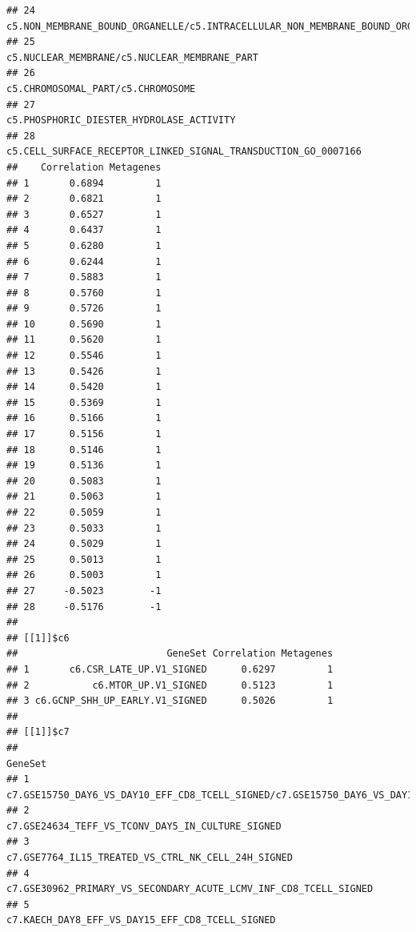 \documentclass{article}\usepackage[]{graphicx}\usepackage[]{color}
\makeatletter
\newenvironment{kframe}{%
 \def\at@end@of@kframe{}%
 \ifinner\ifhmode%
  \def\at@end@of@kframe{\end{minipage}}%
  \begin{minipage}{\columnwidth}%
 \fi\fi%
 \def\FrameCommand##1{\hskip\@totalleftmargin \hskip-\fboxsep
 \colorbox{shadecolor}{##1}\hskip-\fboxsep
     \hskip-\linewidth \hskip-\@totalleftmargin \hskip\columnwidth}%
 \MakeFramed {\advance\hsize-\width
   \@totalleftmargin\z@ \linewidth\hsize
   \@setminipage}}%
 {\par\unskip\endMakeFramed%
 \at@end@of@kframe}
\newenvironment{knitrout}{}{} %
\makeatother
\begin{document}
\begin{knitrout}
\begin{kframe}
\begin{verbatim}
## 24         c5.NON_MEMBRANE_BOUND_ORGANELLE/c5.INTRACELLULAR_NON_MEMBRANE_BOUND_ORGANELLE
## 25                                          c5.NUCLEAR_MEMBRANE/c5.NUCLEAR_MEMBRANE_PART
## 26                                                     c5.CHROMOSOMAL_PART/c5.CHROMOSOME
## 27                                              c5.PHOSPHORIC_DIESTER_HYDROLASE_ACTIVITY
## 28                        c5.CELL_SURFACE_RECEPTOR_LINKED_SIGNAL_TRANSDUCTION_GO_0007166
##    Correlation Metagenes
## 1       0.6894         1
## 2       0.6821         1
## 3       0.6527         1
## 4       0.6437         1
## 5       0.6280         1
## 6       0.6244         1
## 7       0.5883         1
## 8       0.5760         1
## 9       0.5726         1
## 10      0.5690         1
## 11      0.5620         1
## 12      0.5546         1
## 13      0.5426         1
## 14      0.5420         1
## 15      0.5369         1
## 16      0.5166         1
## 17      0.5156         1
## 18      0.5146         1
## 19      0.5136         1
## 20      0.5083         1
## 21      0.5063         1
## 22      0.5059         1
## 23      0.5033         1
## 24      0.5029         1
## 25      0.5013         1
## 26      0.5003         1
## 27     -0.5023        -1
## 28     -0.5176        -1
## 
## [[1]]$c6
##                          GeneSet Correlation Metagenes
## 1       c6.CSR_LATE_UP.V1_SIGNED      0.6297         1
## 2           c6.MTOR_UP.V1_SIGNED      0.5123         1
## 3 c6.GCNP_SHH_UP_EARLY.V1_SIGNED      0.5026         1
## 
## [[1]]$c7
##                                                                                                                                                                               GeneSet
## 1                                                                               c7.GSE15750_DAY6_VS_DAY10_EFF_CD8_TCELL_SIGNED/c7.GSE15750_DAY6_VS_DAY10_TRAF6KO_EFF_CD8_TCELL_SIGNED
## 2                                                                                                                                    c7.GSE24634_TEFF_VS_TCONV_DAY5_IN_CULTURE_SIGNED
## 3                                                                                                                                  c7.GSE7764_IL15_TREATED_VS_CTRL_NK_CELL_24H_SIGNED
## 4                                                                                                                    c7.GSE30962_PRIMARY_VS_SECONDARY_ACUTE_LCMV_INF_CD8_TCELL_SIGNED
## 5                                                                                                                                     c7.KAECH_DAY8_EFF_VS_DAY15_EFF_CD8_TCELL_SIGNED

\end{verbatim}
\end{kframe}
\end{knitrout}
\end{document}
